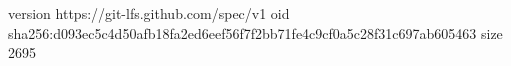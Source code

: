 version https://git-lfs.github.com/spec/v1
oid sha256:d093ec5c4d50afb18fa2ed6eef56f7f2bb71fe4c9cf0a5c28f31c697ab605463
size 2695
